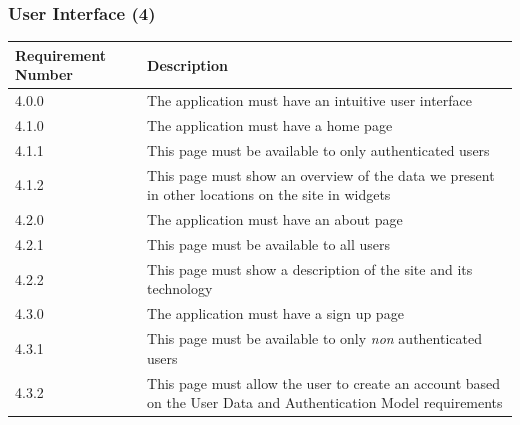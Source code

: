 \documentclass[12pt]{article}
\begin{document}
\subsubsection{User Interface (4)}

\setlength{\tabcolsep}{1cm}
\begin{tabular}{|l|p{8cm}|}
    \hline
    Requirement Number & Description                                                                                                     \\

    \hline\hline
    4.0.0              & The application must have an intuitive user interface                                                           \\

    \hline\hline
    4.1.0              & The application must have a home page                                                                           \\
    \hline
    4.1.1              & This page must be available to only authenticated users                                                         \\
    \hline
    4.1.2              & This page must show an overview of the data we present in other locations on the site in widgets                \\

    \hline\hline
    4.2.0              & The application must have an about page                                                                         \\
    \hline
    4.2.1              & This page must be available to all users                                                                        \\
    \hline
    4.2.2              & This page must show a description of the site and its technology                                                \\
    \hline

    \hline\hline
    4.3.0              & The application must have a sign up page                                                                        \\
    \hline
    4.3.1              & This page must be available to only \textit{non} authenticated users                                            \\
    \hline
    4.3.2              & This page must allow the user to create an account based on the User Data and Authentication Model requirements \\
    \hline


\end{tabular}
\end{document}
